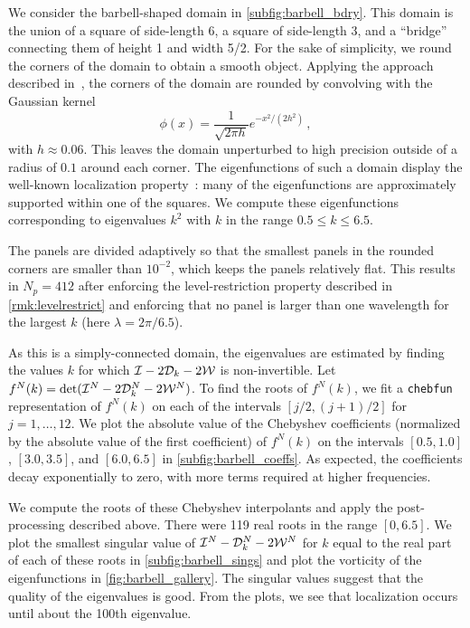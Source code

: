We consider the barbell-shaped domain in \cref{subfig:barbell_bdry}.
This domain is the union of a square of side-length 6,
a square of side-length 3, and a ``bridge'' connecting
them of height 1 and width 5/2.
%
For the sake of simplicity, we round the corners of the domain
to obtain a smooth object.
%
Applying the approach described in~\cite{epstein2016smoothed},
the corners of the domain are rounded by convolving with
the Gaussian kernel
\begin{equation}
  \nonumber
\phi(x) = \frac{1}{\sqrt{2\pi h}} e^{-x^2/(2 h^2)} \, ,
\end{equation}
with $h\approx 0.06$. This leaves the domain unperturbed
to high precision outside of a radius of $0.1$ around
each corner.
%
The eigenfunctions of such a domain display the well-known
localization property~\cite{trefethen2006computed}:
many of the eigenfunctions are approximately supported
within one of the squares.
%
We compute these eigenfunctions corresponding to
eigenvalues $k^2$ with $k$ in the range
$0.5 \leq k \leq 6.5$.

%
The panels are divided adaptively so that the smallest
panels in the rounded corners are smaller than $10^{-2}$,
which keeps the panels relatively flat.
%
This results in $N_p = 412$ after enforcing the
level-restriction property described in
\cref{rmk:levelrestrict}
and enforcing that no panel is larger than
one wavelength for the largest $k$
(here $\lambda=2\pi/6.5$).

As this is a simply-connected domain,
the eigenvalues are estimated by finding the values
$k$ for which $\mathcal I-2{\mathcal D}_{k}-2{\mathcal W}$ is non-invertible.
%
Let $f^N(k) = \det (\mathcal I^N-2{\mathcal D}_{k}^N-2{\mathcal W}^N)$.
To find the roots of $f^N(k)$, we fit a \texttt{chebfun}
representation of $f^N(k)$ on each of the intervals
$[j/2,(j+1)/2]$ for $j = 1,\ldots,12$.
%
We plot the absolute value of the Chebyshev coefficients
(normalized by the absolute value of the first coefficient)
of $f^N(k)$ on the intervals $[0.5,1.0]$, $[3.0,3.5]$,
and $[6.0,6.5]$ in \cref{subfig:barbell_coeffs}.
%
As expected, the coefficients decay exponentially
to zero, with more terms required at higher
frequencies.
%

We compute the roots of these Chebyshev interpolants
and apply the post-processing described above.
%
{\color{red}There were 119 real roots in the range $[0,6.5]$.}
%
We plot the smallest singular value of
$\mathcal I^N-{\mathcal D}_{k}^N-2{\mathcal W}^N$ for {\color{red}$k$ equal to the real part of}
each of these roots in \cref{subfig:barbell_sings}
and plot the vorticity of the eigenfunctions
in \cref{fig:barbell_gallery}.
%
The singular values suggest that the quality of the
eigenvalues is good.
From the plots, we see that localization occurs
until about the 100th eigenvalue.

